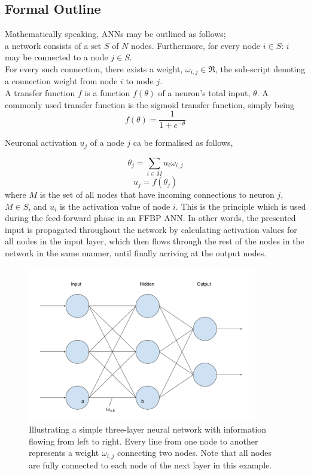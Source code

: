 \subsection{Formal Outline}
Mathematically speaking, ANNs may be outlined as follows;
\\
a network consists of a set $S$ of $N$ nodes. Furthermore, for every node $i\in S$: $i$ may be connected to a node $j \in S$.
\\
For every such connection, there exists a weight, $\omega_{i,j} \in \Re$, the sub-script denoting a connection weight from node $i$ to node $j$.
\\
A transfer function $f$ is a function $f(\theta)$ of a neuron's total input, $\theta$. A commonly used transfer function is the sigmoid transfer function, simply being 
\begin{equation}\label{sigmoid}
    f(\theta) = \frac{1}{1+e^{-\theta}}
\end{equation}

Neuronal activation $u_j$ of a node $j$ ca be formalised as follows,

\begin{equation}\label{input}
    \theta_j = \sum_{i\in M} u_i \omega_{i,j}
\end{equation}
\begin{equation}\label{activation}
    u_j = f(\theta_j)
\end{equation}
where $M$ is the set of all nodes that have incoming connections to neuron $j$, $M \in S$, and $u_i$ is the activation value of node $i$. This is the principle which is used during the feed-forward phase in an FFBP ANN. In other words, the presented input is propagated throughout the network by calculating activation values for all nodes in the input layer, which then flows through the rest of the nodes in the network in the same manner, until finally arriving at the output nodes.

\begin{figure}
\centering
\includegraphics[width=10cm]{fig/three_layer_ann}
\caption{Illustrating a simple three-layer neural network with information flowing from left to right. Every line from one node to another represents a weight $\omega_{i,j}$ connecting two nodes. Note that all nodes are fully connected to each node of the next layer in this example.}
\label{fig:three_layer_ann}
\end{figure}

